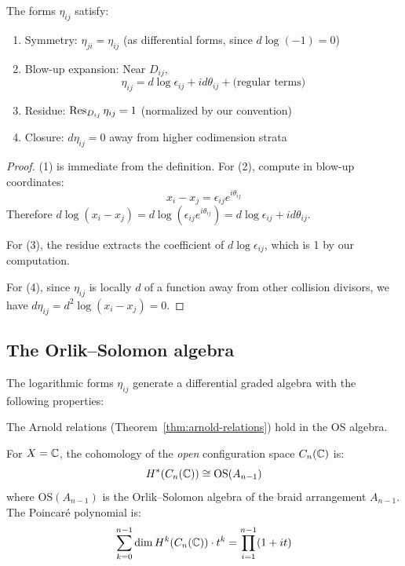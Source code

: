  
\begin{proposition}\label{prop:eta}
The forms $\eta_{ij}$ satisfy:
\begin{enumerate}
\item Symmetry: $\eta_{ji} = \eta_{ij}$ (as differential forms, since $d\log(-1) = 0$)
\item Blow-up expansion: Near $D_{ij}$,
\[
\eta_{ij} = d\log \epsilon_{ij} + id\theta_{ij} + \text{(regular terms)}
\]
\item Residue: $\operatorname{Res}_{D_{ij}} \eta_{ij} = 1$ (normalized by our convention)
\item Closure: $d\eta_{ij} = 0$ away from higher codimension strata
\end{enumerate}
\end{proposition}
 
\begin{proof}
(1) is immediate from the definition. For (2), compute in blow-up coordinates:
\[
x_i - x_j = \epsilon_{ij} e^{i\theta_{ij}}
\]
Therefore $d\log(x_i - x_j) = d\log(\epsilon_{ij} e^{i\theta_{ij}}) = d\log \epsilon_{ij} + id\theta_{ij}$.
 
For (3), the residue extracts the coefficient of $d\log \epsilon_{ij}$, which is 1 by our computation.
 
For (4), since $\eta_{ij}$ is locally $d$ of a function away from other collision divisors, we have $d\eta_{ij} = d^2\log(x_i - x_j) = 0$.
\end{proof}
 
\subsection{The Orlik--Solomon algebra}
 
The logarithmic forms $\eta_{ij}$ generate a differential graded algebra with the following properties:

The Arnold relations (Theorem~\ref{thm:arnold-relations}) hold in the OS algebra.
 
\begin{theorem}\label{thm:os-cohomology-config}
For $X = \mathbb{C}$, the cohomology of the \emph{open} configuration space $C_n(\mathbb{C})$ is:
\[
H^*(C_n(\mathbb{C})) \cong \text{OS}(A_{n-1})
\]
where $\text{OS}(A_{n-1})$ is the Orlik--Solomon algebra of the braid arrangement $A_{n-1}$. The Poincaré polynomial is:
\[
\sum_{k=0}^{n-1} \dim H^k(C_n(\mathbb{C})) \cdot t^k = \prod_{i=1}^{n-1}(1 + it)
\]
\end{theorem}

